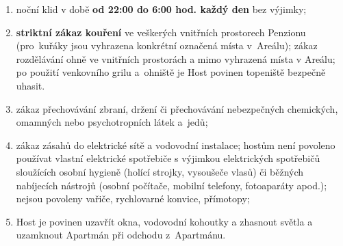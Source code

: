 \documentclass[a4paper]{scrartcl}
\begin{document}
\begin{enumerate}
\begin{enumerate}
\begin{enumerate}
                  \item
                        noční klid v době \textbf{od 22:00 do 6:00 hod. každý den} bez
                        výjimky;
                  \item
                        \textbf{striktní zákaz kouření} ve veškerých vnitřních prostorech
                        Penzionu (pro~kuřáky jsou vyhrazena konkrétní označená místa
                        v~Areálu); zákaz rozdělávání ohně ve vnitřních prostorách a mimo
                        vyhrazená místa v Areálu; po použití venkovního grilu a~ohniště je
                        Host povinen topeniště bezpečně uhasit.
                  \item
                        zákaz přechovávání zbraní, držení či přechovávání nebezpečných
                        chemických, omamných nebo psychotropních látek a~jedů;
                  \item
                        zákaz zásahů do elektrické sítě a vodovodní instalace; hostům není
                        povoleno používat vlastní elektrické spotřebiče s výjimkou
                        elektrických spotřebičů sloužících osobní hygieně (holící strojky,
                        vysoušeče vlasů) či běžných nabíjecích nástrojů (osobní počítače,
                        mobilní telefony, fotoaparáty apod.); nejsou povoleny vařiče,
                        rychlovarné konvice, přímotopy;
                  \item
                        Host je povinen uzavřít okna, vodovodní kohoutky a zhasnout světla a
                        uzamknout Apartmán při odchodu z~Apartmánu.
                \end{enumerate}


\end{enumerate}
\end{enumerate}
\end{document}
